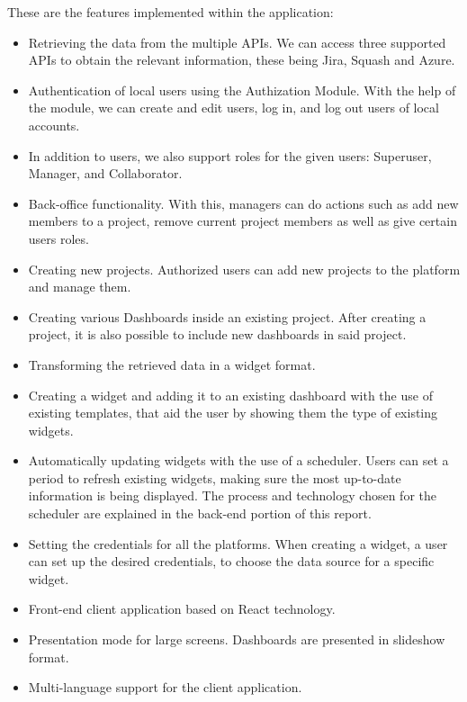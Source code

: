 \documentclass[a4paper,twoside,10pt]{report}
\begin{document}
These are the features implemented within the application:
 
\begin{itemize}
   \item Retrieving the data from the multiple APIs. We can access three supported APIs to obtain the relevant information, these being Jira, Squash and Azure.
   
   \item Authentication of local users using the Authization Module. With the help of the module, we can create and edit users, log in, and log out users of local accounts.
   
   \item In addition to users, we also support roles for the given users: Superuser, Manager, and Collaborator.
   
   \item Back-office functionality. With this, managers can do actions such as add new members to a project, remove current project members as well as give certain users roles.

   \item Creating new projects. Authorized users can add new projects to the platform and manage them.

   \item Creating various Dashboards inside an existing project. After creating a project, it is also possible to include new dashboards in said project.

   \item Transforming the retrieved data in a widget format.

   \item Creating a widget and adding it to an existing dashboard with the use of existing templates, that aid the user by showing them the type of existing widgets.

   \item Automatically updating widgets with the use of a scheduler. Users can set a period to refresh existing widgets, making sure the most up-to-date information is being displayed. The process and technology chosen for the scheduler are explained in the back-end portion of this report.

   \item Setting the credentials for all the platforms. When creating a widget, a user can set up the desired credentials, to choose the data source for a specific widget.

   \item Front-end client application based on React technology.
   
   \item Presentation mode for large screens. Dashboards are presented in slideshow format.

   \item Multi-language support for the client application.

\end{itemize}
\end{document}
